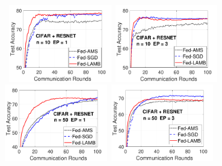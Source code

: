 \documentclass[11pt]{article}
\begin{document}
\begin{figure}[t]
    \begin{center}
        \mbox{
        \hspace{-0.05in}\includegraphics[width=0.4\textwidth]{new_figure/cifar_testerror_resnet_ep1_client10_iid1_SGD.pdf}
        \hspace{-0.13in} \includegraphics[width=0.4\textwidth]{new_figure/cifar_testerror_resnet_ep3_client10_iid1_SGD.pdf}
        }
        \mbox{
        \hspace{-0.05in}\includegraphics[width=0.4\textwidth]{new_figure/cifar_testerror_resnet_ep1_client50_iid1_SGD.pdf}
        \hspace{-0.1in}\includegraphics[width=0.4\textwidth]{new_figure/cifar_testerror_resnet_ep3_client50_iid1_SGD.pdf}
        }

\end{center}
\end{figure}
\end{document}
